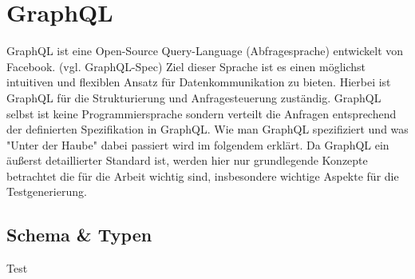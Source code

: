 \section{GraphQL}

GraphQL ist eine Open-Source Query-Language (Abfragesprache) entwickelt von Facebook. (vgl. GraphQL-Spec)
Ziel dieser Sprache ist es einen möglichst intuitiven und flexiblen Ansatz für Datenkommunikation zu bieten.
Hierbei ist GraphQL für die Strukturierung und Anfragesteuerung zuständig. GraphQL selbst ist keine Programmiersprache
sondern verteilt die Anfragen entsprechend der definierten Spezifikation in GraphQL.
Wie man GraphQL spezifiziert und was "Unter der Haube" dabei passiert wird im folgendem erklärt.
Da GraphQL ein äußerst detaillierter Standard ist, werden hier nur grundlegende Konzepte betrachtet die für die
Arbeit wichtig sind, insbesondere wichtige Aspekte für die Testgenerierung.

\subsection{Schema \& Typen}

Test







